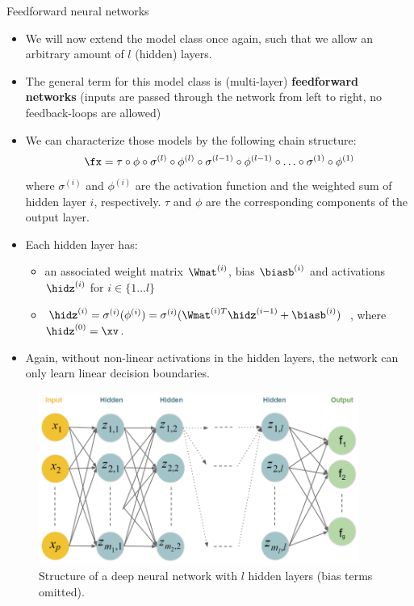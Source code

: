 \begin{vbframe}{Feedforward neural networks}
\begin{itemize}
\vspace{15mm}
\item We will now extend the model class once again, such that we allow an arbitrary amount of $l$ (hidden) layers.
\vspace{5mm}
\item The general term for this model class is (multi-layer) \textbf{feedforward networks} (inputs are passed through the network from left to right, no feedback-loops are allowed)
\end{itemize}
\framebreak

\begin{itemize}
\item We can characterize those models by the following chain structure: $$\fx = \tau \circ \phi \circ \sigma^{(l)} \circ \phi^{(l)} \circ \sigma^{(l-1)} \circ \phi^{(l-1)} \circ \ldots \circ \sigma^{(1)} \circ \phi^{(1)}$$ where $\sigma^{(i)}$ and $\phi^{(i)}$ are the activation function and the weighted sum of hidden layer $i$, respectively. $\tau$ and $\phi$ are the corresponding components of the output layer.
\vspace{5mm}
\item Each hidden layer has: 
\begin{itemize}
\vspace{2mm}
\item an associated weight matrix $\Wmat^{(i)}$, bias $\biasb^{(i)}$ and activations $\hidz^{(i)}$ for $i \in \{ 1 \ldots l\}$
\vspace{2mm}
\item $\hidz^{(i)} = \sigma^{(i)}(\phi^{(i)}) = \sigma^{(i)}(\Wmat^{(i)T}\hidz^{(i - 1)} + \biasb^{(i)})$ , where $\hidz^{(0)} = \xv$.
\end{itemize}
\vspace{5mm}
\item Again, without non-linear activations in the hidden layers, the network can only learn linear decision boundaries.
  \end{itemize}
\framebreak

\lz
\begin{figure}
\centering
\includegraphics[width=10.5cm]{figure/deepneuralnet_new.png}
\caption{Structure of a deep neural network with $l$ hidden layers (bias terms omitted).}
  \end{figure}
\end{vbframe}  

